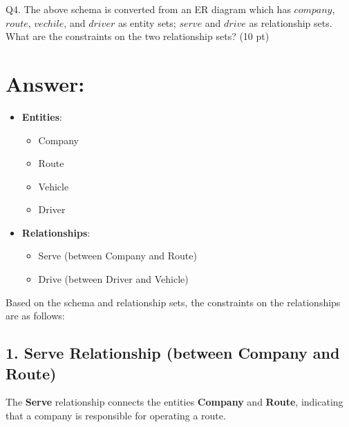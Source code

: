 \documentclass{article}
\begin{document}

Q4. The above schema is converted from an ER diagram which has
\(company\), \(route\), \(vechile\), and \(driver\) as entity sets;
\(serve\) and \(drive\) as relationship sets. What are the constraints
on the two relationship sets? (10 pt)

\section*{Answer:}

\begin{itemize}
	\item \textbf{Entities}: 
	\begin{itemize}
		\item Company
		\item Route
		\item Vehicle
		\item Driver
	\end{itemize}
	\item \textbf{Relationships}: 
	\begin{itemize}
		\item Serve (between Company and Route)
		\item Drive (between Driver and Vehicle)
	\end{itemize}
\end{itemize}

Based on the schema and relationship sets, the constraints on the relationships are as follows:

\subsection*{1. Serve Relationship (between Company and Route)}
The \textbf{Serve} relationship connects the entities \textbf{Company} and \textbf{Route}, indicating that a company is responsible for operating a route.
\end{document}
